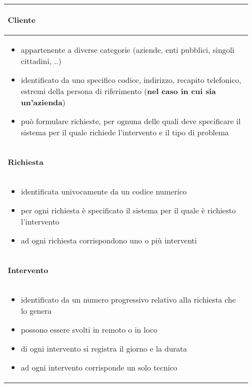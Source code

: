 \documentclass{article}
\begin{document}
\begin{table}[h]
    \centering
    \begin{tabular}{|m{17cm}|}
        \hline
        \begin{center} \textbf{Cliente} \end{center} \\
        \hline
        \begin{itemize}
            \item appartenente a diverse categorie (aziende, enti pubblici, singoli cittadini, ..)
            \item identificato da uno specifico codice, indirizzo, recapito telefonico, estremi della persona di riferimento (\textbf{nel caso in cui sia un'azienda})
            \item può formulare richieste, per ognuna delle quali deve specificare il sistema per il quale richiede l'intervento e il tipo di problema
        \end{itemize} \\
        
        \hline
        \begin{center}\textbf{Richiesta}\end{center} \\
        \hline
        \begin{itemize}
            \item identificata univocamente da un codice numerico
            \item per ogni richiesta è specificato il sistema per il quale è richiesto l'intervento
            \item ad ogni richiesta corrispondono uno o più interventi
        \end{itemize} \\
        
        \hline
        \begin{center}\textbf{Intervento}\end{center} \\
        \hline
        \begin{itemize}
            \item identificato da un numero progressivo relativo alla richiesta che lo genera
            \item possono essere svolti in remoto o in loco
            \item di ogni intervento si registra il giorno e la durata
            \item ad ogni intervento corrisponde un solo tecnico
        \end{itemize} \\
        

\end{tabular}
\end{table}
\end{document}
